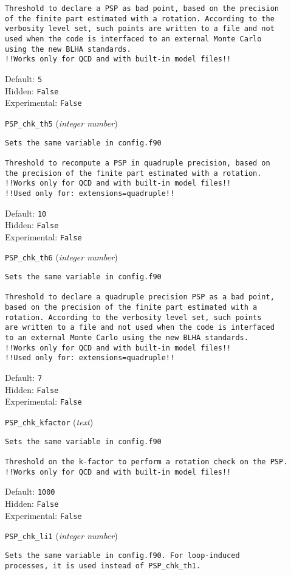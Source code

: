 \begin{basedescript}{\desclabelstyle{\pushlabel}}
\begin{verbatim}
Threshold to declare a PSP as bad point, based on the precision
of the finite part estimated with a rotation. According to the
verbosity level set, such points are written to a file and not
used when the code is interfaced to an external Monte Carlo
using the new BLHA standards.
!!Works only for QCD and with built-in model files!!
\end{verbatim}
Default: \verb|5|
\\Hidden: \verb|False|
\\Experimental: \verb|False|
\\\item[\colorbox{gray!30}{\texttt{PSP\_chk\_th5}}] (\textit{integer number})
\begin{verbatim}
Sets the same variable in config.f90

Threshold to recompute a PSP in quadruple precision, based on
the precision of the finite part estimated with a rotation.
!!Works only for QCD and with built-in model files!!
!!Used only for: extensions=quadruple!!
\end{verbatim}
Default: \verb|10|
\\Hidden: \verb|False|
\\Experimental: \verb|False|
\\\item[\colorbox{gray!30}{\texttt{PSP\_chk\_th6}}] (\textit{integer number})
\begin{verbatim}
Sets the same variable in config.f90

Threshold to declare a quadruple precision PSP as a bad point,
based on the precision of the finite part estimated with a
rotation. According to the verbosity level set, such points
are written to a file and not used when the code is interfaced
to an external Monte Carlo using the new BLHA standards.
!!Works only for QCD and with built-in model files!!
!!Used only for: extensions=quadruple!!
\end{verbatim}
Default: \verb|7|
\\Hidden: \verb|False|
\\Experimental: \verb|False|
\\\item[\colorbox{gray!30}{\texttt{PSP\_chk\_kfactor}}] (\textit{text})
\begin{verbatim}
Sets the same variable in config.f90

Threshold on the k-factor to perform a rotation check on the PSP.
!!Works only for QCD and with built-in model files!!
\end{verbatim}
Default: \verb|1000|
\\Hidden: \verb|False|
\\Experimental: \verb|False|
\\\item[\colorbox{gray!30}{\texttt{PSP\_chk\_li1}}] (\textit{integer number})
\begin{verbatim}
Sets the same variable in config.f90. For loop-induced
processes, it is used instead of PSP_chk_th1.


\end{verbatim}
\end{basedescript}

